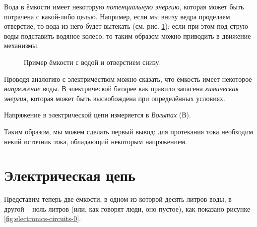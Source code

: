 \documentclass[a4paper,twoside]{book}
\begin{document}
Вода в ёмкости имеет некоторую \emph{потенциальную энергию}, которая может быть
потрачена с какой-либо целью.  Например, если мы внизу ведра проделаем
отверстие, то вода из него будет вытекать
(см. рис. \ref{fig:electronics-current-1}); если при этом под струю воды
подставить водяное колесо, то таким образом можно приводить в движение
механизмы.

\begin{figure}[ht]
  \centering
  \caption{Пример ёмкости с водой и отверстием снизу.}
  \label{fig:electronics-current-1}
\end{figure}

Проводя аналогию с электричеством можно сказать, что ёмкость имеет некоторое
\emph{напряжение} воды.  В электрической батарее как правило запасена
\emph{химическая энергия}, которая может быть высвобождена при определённых
условиях.

Напряжение в электрической цепи измеряется в \emph{Вольтах} (В).

Таким образом, мы можем сделать первый вывод: для протекания тока необходим
некий источник тока, обладающий некоторым напряжением.

\section{Электрическая цепь}

Представим теперь две ёмкости, в одном из которой десять литров воды, в другой
-- ноль литров (или, как говорят люди, оно пустое), как показано рисунке
\ref{fig:electronics-circuits-0}.
\end{document}
